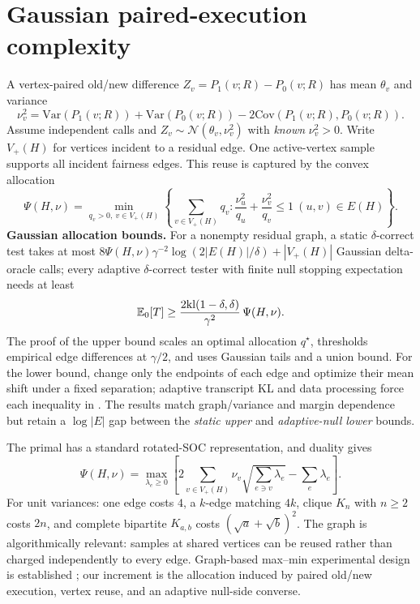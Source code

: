 \section{Gaussian paired-execution complexity}
A vertex-paired old/new difference $Z_v=P_1(v;R)-P_0(v;R)$ has mean $\theta_v$ and variance
\begin{equation}\label{eq:variance}
\nu_v^2=\mathrm{Var}(P_1(v;R))+\mathrm{Var}(P_0(v;R))-2\mathrm{Cov}(P_1(v;R),P_0(v;R)).
\end{equation}
Assume independent calls and $Z_v\sim\mathcal N(\theta_v,\nu_v^2)$ with \emph{known} $\nu_v^2>0$. Write $V_+(H)$ for vertices incident to a residual edge. One active-vertex sample supports all incident fairness edges. This reuse is captured by the convex allocation
\begin{equation}\label{eq:psi}
\Psi(H,\nu)=\min_{q_v>0,\ v\in V_+(H)}\left\{\sum_{v\in V_+(H)}q_v:\frac{\nu_u^2}{q_u}+\frac{\nu_v^2}{q_v}\le1\ (u,v)\in E(H)\right\}.
\end{equation}
\textbf{Gaussian allocation bounds.} For a nonempty residual graph, a static $\delta$-correct test takes at most $8\Psi(H,\nu)\gamma^{-2}\log(2|E(H)|/\delta)+|V_+(H)|$ Gaussian delta-oracle calls; every adaptive $\delta$-correct tester with finite null stopping expectation needs at least
\begin{equation}\label{eq:psi-lb}
\mathbb{E}_0[T]\ge\frac{2\mathrm{kl}(1-\delta,\delta)}{\gamma^2}\,\Psi(H,\nu).
\end{equation}
The proof of the upper bound scales an optimal allocation $q^\star$, thresholds empirical edge differences at $\gamma/2$, and uses Gaussian tails and a union bound. For the lower bound, change only the endpoints of each edge and optimize their mean shift under a fixed separation; adaptive transcript KL and data processing force each inequality in . The results match graph/variance and margin dependence but retain a $\log|E|$ gap between the \emph{static upper} and \emph{adaptive-null lower} bounds.

The primal has a standard rotated-SOC representation, and duality gives
\begin{equation}\label{eq:psi-dual}
\Psi(H,\nu)=\max_{\lambda_e\ge0}\left[2\sum_{v\in V_+(H)}\nu_v\sqrt{\sum_{e\ni v}\lambda_e}-\sum_e\lambda_e\right].
\end{equation}
For unit variances: one edge costs $4$, a $k$-edge matching $4k$, clique $K_n$ with $n\ge2$ costs $2n$, and complete bipartite $K_{a,b}$ costs $(\sqrt a+\sqrt b)^2$. The graph is algorithmically relevant: samples at shared vertices can be reused rather than charged independently to every edge. Graph-based max--min experimental design is established \cite{SinghSinghDavidov2025}; our increment is the allocation induced by paired old/new execution, vertex reuse, and an adaptive null-side converse.

